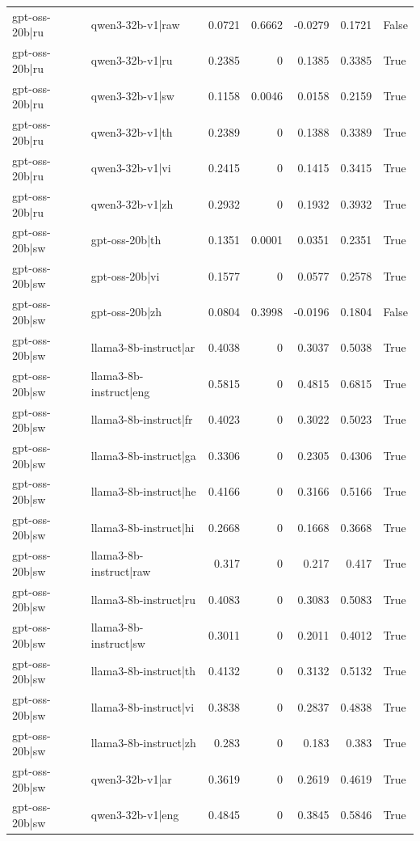 \begin{table}
\begin{tabular}{l l r r r r l}
gpt-oss-20b|ru & qwen3-32b-v1|raw & 0.0721 & 0.6662 & -0.0279 & 0.1721 & False \\
gpt-oss-20b|ru & qwen3-32b-v1|ru & 0.2385 & 0 & 0.1385 & 0.3385 & True \\
gpt-oss-20b|ru & qwen3-32b-v1|sw & 0.1158 & 0.0046 & 0.0158 & 0.2159 & True \\
gpt-oss-20b|ru & qwen3-32b-v1|th & 0.2389 & 0 & 0.1388 & 0.3389 & True \\
gpt-oss-20b|ru & qwen3-32b-v1|vi & 0.2415 & 0 & 0.1415 & 0.3415 & True \\
gpt-oss-20b|ru & qwen3-32b-v1|zh & 0.2932 & 0 & 0.1932 & 0.3932 & True \\
gpt-oss-20b|sw & gpt-oss-20b|th & 0.1351 & 0.0001 & 0.0351 & 0.2351 & True \\
gpt-oss-20b|sw & gpt-oss-20b|vi & 0.1577 & 0 & 0.0577 & 0.2578 & True \\
gpt-oss-20b|sw & gpt-oss-20b|zh & 0.0804 & 0.3998 & -0.0196 & 0.1804 & False \\
gpt-oss-20b|sw & llama3-8b-instruct|ar & 0.4038 & 0 & 0.3037 & 0.5038 & True \\
gpt-oss-20b|sw & llama3-8b-instruct|eng & 0.5815 & 0 & 0.4815 & 0.6815 & True \\
gpt-oss-20b|sw & llama3-8b-instruct|fr & 0.4023 & 0 & 0.3022 & 0.5023 & True \\
gpt-oss-20b|sw & llama3-8b-instruct|ga & 0.3306 & 0 & 0.2305 & 0.4306 & True \\
gpt-oss-20b|sw & llama3-8b-instruct|he & 0.4166 & 0 & 0.3166 & 0.5166 & True \\
gpt-oss-20b|sw & llama3-8b-instruct|hi & 0.2668 & 0 & 0.1668 & 0.3668 & True \\
gpt-oss-20b|sw & llama3-8b-instruct|raw & 0.317 & 0 & 0.217 & 0.417 & True \\
gpt-oss-20b|sw & llama3-8b-instruct|ru & 0.4083 & 0 & 0.3083 & 0.5083 & True \\
gpt-oss-20b|sw & llama3-8b-instruct|sw & 0.3011 & 0 & 0.2011 & 0.4012 & True \\
gpt-oss-20b|sw & llama3-8b-instruct|th & 0.4132 & 0 & 0.3132 & 0.5132 & True \\
gpt-oss-20b|sw & llama3-8b-instruct|vi & 0.3838 & 0 & 0.2837 & 0.4838 & True \\
gpt-oss-20b|sw & llama3-8b-instruct|zh & 0.283 & 0 & 0.183 & 0.383 & True \\
gpt-oss-20b|sw & qwen3-32b-v1|ar & 0.3619 & 0 & 0.2619 & 0.4619 & True \\
gpt-oss-20b|sw & qwen3-32b-v1|eng & 0.4845 & 0 & 0.3845 & 0.5846 & True \\

\end{tabular}
\end{table}
